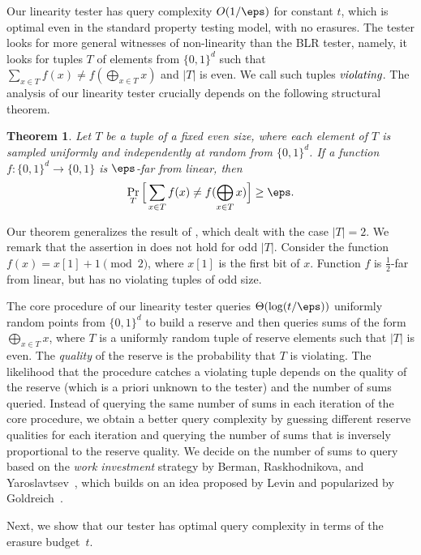 \documentclass[11pt]{article}
\numberwithin{equation}{section}
\newtheorem{theorem}{Theorem}[section]
\theoremstyle{definition}
\theoremstyle{plain}
\begin{document}
Our linearity tester has query complexity $O(1/\eps)$ for constant $t$, which is optimal even in the standard property testing model, with no erasures. The tester looks for more general witnesses of non-linearity than the BLR tester, namely,  it looks for tuples $T$ of elements from $\{0,1\}^d$ such that $\sum_{x \in T} f(x) \neq f(\bigoplus_{x\in T} x)$ and $|T|$ is even.
%
We call such tuples $\emph{violating}$. The analysis of our linearity tester crucially depends on the following structural theorem.

\begin{theorem}\label{thm:fourier}
Let $T$ be a tuple of a fixed even size, where each element of $T$ is sampled uniformly and independently at random from $\{0,1\}^d$. If a function $f \colon \{0,1\}^d \to \{0,1\}$ is $\eps$-far from linear, then 
\begin{equation*}
    \Pr_T\Big[\sum_{x\in T}f(x) \neq f(\bigoplus_{x\in T} x )\Big] \geq \eps.
\end{equation*}
\end{theorem}

\noindent  Our theorem generalizes the result of \cite{BellareCHKS96}, which dealt with the case $|T|=2$. We remark that the assertion in  does not hold for odd $|T|$. Consider the function $f(x) = x[1] + 1 \pmod 2$, where $x[1]$ is the first bit of $x$. Function $f$ is $\frac 12$-far from linear, but  has no violating tuples of odd size.

The core procedure of our linearity tester queries $\Theta(\log(t/\eps))$ uniformly random points from $\{0,1\}^d$ to build a reserve and then queries sums of the form $\bigoplus_{x \in T} x$, where $T$ is a uniformly random tuple of reserve elements such that $|T|$ is even. The \emph{quality} of the reserve is the probability that $T$ is violating. The  likelihood that the procedure catches a violating tuple depends on the quality of the reserve (which is a priori unknown to the tester) and the number of sums queried. Instead of querying the same number of sums in each iteration of the core procedure, %
we
obtain a better query complexity by guessing different reserve qualities for each iteration and querying the number of sums that is inversely proportional to the reserve quality. We decide on the number of sums to query based on the {\em work investment} strategy by Berman, Raskhodnikova, and Yaroslavtsev~\cite{BermanRY14}, which builds on an idea proposed by Levin and popularized by Goldreich~\cite{Goldreich14}.   


Next, we show that our tester has optimal query complexity in terms of the erasure budget~$t$. 
\end{document}
